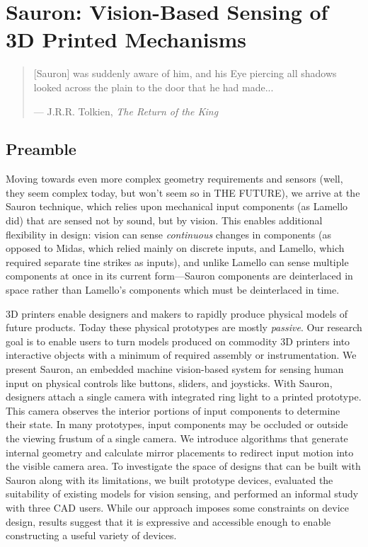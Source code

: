 \chapter{Sauron: Vision-Based Sensing of 3D Printed Mechanisms}

\begin{quote}
[Sauron] was suddenly aware of him, and his Eye piercing all shadows looked across the plain to the door that he had made...

--- J.R.R. Tolkien, \emph{The Return of the King}
\end{quote}

\section{Preamble}

Moving towards even more complex geometry requirements and sensors  (well, they seem complex today, but won't seem so in THE FUTURE), we arrive at the Sauron technique, which relies upon mechanical input components (as Lamello did) that are sensed not by sound, but by vision. This enables additional flexibility in design: vision can sense \emph{continuous} changes in components (as opposed to Midas, which relied mainly on discrete inputs, and Lamello, which required separate tine strikes as inputs), and unlike Lamello can sense multiple components at once in its current form---Sauron components are deinterlaced in space rather than Lamello's components which must be deinterlaced in time.

3D printers enable designers and makers to rapidly produce physical models of future products. Today these physical prototypes are mostly {\em passive}. Our research goal is to enable users to turn models produced on commodity 3D printers into interactive objects with a minimum of required assembly or instrumentation. We present Sauron, an embedded machine vision-based system for sensing human input on physical controls like buttons, sliders, and joysticks. With Sauron, designers attach a single camera with integrated ring light to a printed prototype. This camera observes the interior portions of input components to determine their state. In many prototypes, input components may be occluded or outside the viewing frustum of a single camera. We introduce algorithms that generate internal geometry and calculate mirror placements to redirect input motion into the visible camera area.   
To investigate the space of designs that can be built with Sauron along with its limitations, we built prototype devices, evaluated the suitability of existing models for vision sensing, and performed an informal study with three CAD users. While our approach imposes some constraints on device design, results suggest that it is expressive and accessible enough to enable constructing a useful variety of devices.

